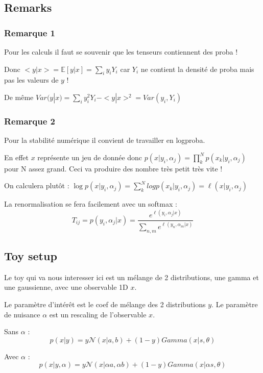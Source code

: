 \subsection{Remarks} %
\label{sub:remarks}

\subsubsection{Remarque 1}

Pour les calculs il faut se souvenir que les tenseurs contiennent des proba !

Donc $<y|x>= \mathbb E[y|x] = \sum_i y_i Y_i$ car $Y_i$ ne contient la densité de proba mais pas les valeurs de $y$ !

De même $Var(y|x) = \sum_i y_i^2 Y_i - <y|x>^2 = Var(y_i, Y_i)$

\subsubsection{Remarque 2}

Pour la stabilité numérique il convient de travailler en logproba.

En effet $x$ représente un jeu de donnée donc $p(x | y_i, \alpha_j) = \prod_k^N p(x_k | y_i, \alpha_j)$ pour N assez grand.
Ceci va produire des nombre très petit très vite !

On calculera plutôt : $\log p(x | y_i, \alpha_j) = \sum_k^N log p(x_k | y_i, \alpha_j) = \ell(x | y_i, \alpha_j)$

La renormalisation se fera facilement avec un softmax : 
$$ 
    T_{ij} = p(y_i, \alpha_j | x) = \frac{e^{\ell(y_i, \alpha_j| x)} }{\sum_{n,m} e^{\ell(y_n, \alpha_m| x)} }
$$


\subsection{Toy setup} %
\label{sub:toy_setup}

Le toy qui va nous interesser ici est un mélange de 2 distributions, une gamma et une gaussienne, avec une observable 1D $x$.

Le paramètre d'intérêt est le coef de mélange des 2 distributions $y$.
Le paramètre de nuisance $\alpha$ est un rescaling de l'observable $x$.

Sans $\alpha$ :
$$
    p(x | y) = y \mathcal N(x|a, b) + (1-y) Gamma(x|s, \theta)
$$

Avec $\alpha$ :
$$
    p(x | y, \alpha) = y \mathcal N(x|\alpha a, \alpha b) + (1-y) Gamma(x|\alpha s, \theta)
$$


